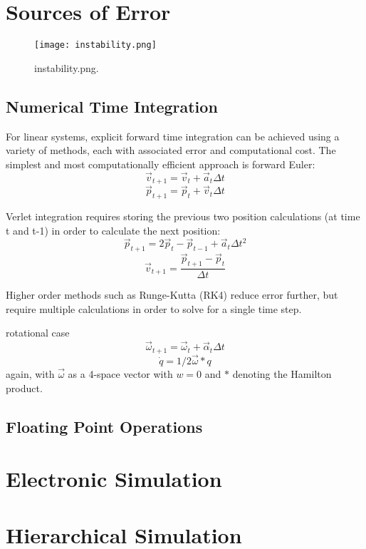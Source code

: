 {\section{Sources of Error}

\begin{figure}
  \texttt{[image: instability.png]}
  \caption{instability.png.}
  \label{fig:instability}
\end{figure}

\subsection{Numerical Time Integration}

For linear systems, explicit forward time integration can be achieved using a variety of methods, each with associated error and computational cost.  The simplest and most computationally efficient approach is forward Euler:
\[ \vec{v}_{t+1} = \vec{v}_{t} +  \vec{a}_{t}\Delta t\]
\[ \vec{p}_{t+1} = \vec{p}_{t} +  \vec{v}_{t}\Delta t\]

Verlet integration requires storing the previous two position calculations (at time t and t-1) in order to calculate the next position:
\[ \vec{p}_{t+1} = 2\vec{p}_{t} - \vec{p}_{t-1} +  \vec{a}_{t}\Delta t^2\]
\[ \vec{v}_{t+1} = \dfrac{\vec{p}_{t+1} - \vec{p}_{t}}{\Delta t}\]

Higher order methods such as Runge-Kutta (RK4) reduce error further, but require multiple calculations in order to solve for a single time step.

rotational case
\[ \vec{\omega}_{t+1} = \vec{\omega}_{t} +  \vec{\alpha}_{t}\Delta t\]
\[ \dot{q} = 1/2\vec{\omega}*q\]
again, with $\vec{\omega}$ as a 4-space vector with $w=0$ and $*$ denoting the Hamilton product.

\subsection{Floating Point Operations}

\section{Electronic Simulation}\label{sec:electronicSim}

\section{Hierarchical Simulation}

}
